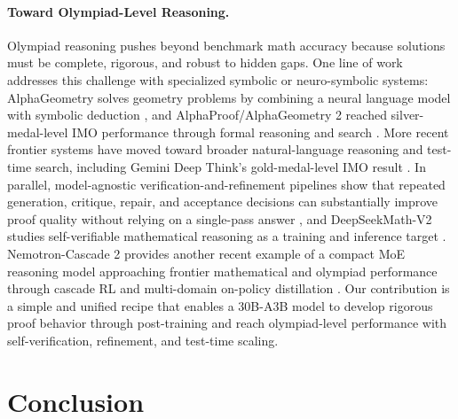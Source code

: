 \documentclass{llmxive}
\begin{document}
\paragraph{Toward Olympiad-Level Reasoning.}
Olympiad reasoning pushes beyond benchmark math accuracy because solutions must
be complete, rigorous, and robust to hidden gaps. One line of work addresses this
challenge with specialized symbolic or neuro-symbolic systems: AlphaGeometry
solves geometry problems by combining a neural language model with symbolic
deduction \citep{trinh2024alphageometry}, and AlphaProof/AlphaGeometry 2 reached
silver-medal-level IMO performance through formal reasoning and search
\citep{deepmind2024alphaproof}. More recent frontier systems have moved toward
broader natural-language reasoning and test-time search, including Gemini Deep
Think's gold-medal-level IMO result \citep{deepmind2025geminiimo}. In parallel,
model-agnostic verification-and-refinement pipelines show that repeated
generation, critique, repair, and acceptance decisions can substantially improve
proof quality without relying on a single-pass answer \citep{huang2025winning},
and DeepSeekMath-V2 studies self-verifiable mathematical reasoning as a training
and inference target \citep{deepseekmathv2}. Nemotron-Cascade 2 provides another
recent example of a compact MoE reasoning model approaching frontier mathematical
and olympiad performance through cascade RL and multi-domain on-policy
distillation \citep{yang2026nemotroncascade2}. Our contribution is a simple and
unified recipe that enables a 30B-A3B model to develop rigorous proof behavior
through post-training and reach olympiad-level performance with
self-verification, refinement, and test-time scaling.

\section{Conclusion}
\end{document}
